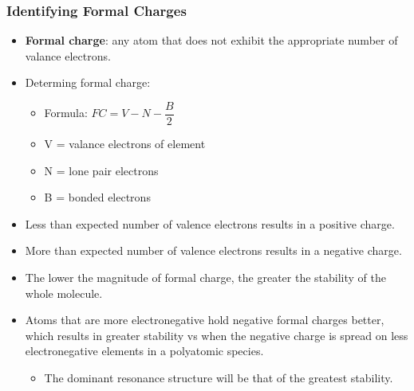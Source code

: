 \documentclass[12pt,a4paper]{article}
\begin{document}
\begin{itemize}
    \subsubsection{Identifying Formal Charges}
    \begin{itemize}
    \item \textbf{Formal charge}: any atom that does not exhibit the appropriate number of valance electrons.
    \item Determing formal charge:
        \begin{itemize}
            \item Formula: {\color{o-Sun}\(FC = V - N - \dfrac{B}{2}\)}
            \item V = valance electrons of element
            \item N = lone pair electrons
            \item B = bonded electrons
        \end{itemize}
    \item {\color{pos}Less} than expected number of valence electrons results in a {\color{pos} positive} charge.
    \item {\color{neg}More} than expected number of valence electrons results in a {\color{neg}negative} charge.
    \item The lower the {\color{o-Sun}magnitude} of formal charge, the {\color{o-Sun}greater the stability} of the whole molecule.
    \item Atoms that are {\color{neg}more electronegative} hold {\color{neg}negative} formal charges better, which results in {\color{o-Sun}greater stability} vs when the negative charge is spread on less electronegative elements in a polyatomic species.
        \begin{itemize}
            \item The dominant resonance structure will be that of the greatest stability. 
        \end{itemize}
    \end{itemize}
\end{itemize}
\end{document}
